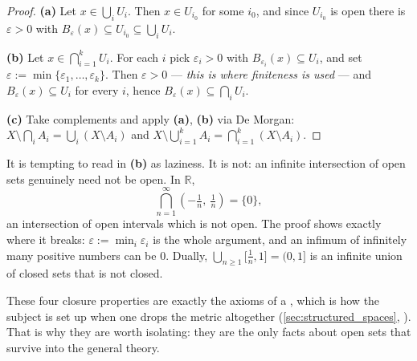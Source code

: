 \begin{proof}
\textbf{(a)} Let $x \in \bigcup_i U_i$. Then $x \in U_{i_0}$ for some $i_0$, and since $U_{i_0}$
is open there is $\varepsilon>0$ with $B_\varepsilon(x) \subseteq U_{i_0} \subseteq \bigcup_iU_i$.

\textbf{(b)} Let $x \in \bigcap_{i=1}^kU_i$. For each $i$ pick $\varepsilon_i>0$ with
$B_{\varepsilon_i}(x) \subseteq U_i$, and set $\varepsilon := \min\{\varepsilon_1,\dots,\varepsilon_k\}$.
Then $\varepsilon > 0$ --- \emph{this is where finiteness is used} --- and
$B_\varepsilon(x) \subseteq U_i$ for every $i$, hence $B_\varepsilon(x) \subseteq \bigcap_iU_i$.

\textbf{(c)} Take complements and apply \textbf{(a)}, \textbf{(b)} via De Morgan:
$X\setminus\bigcap_iA_i = \bigcup_i(X\setminus A_i)$ and
$X\setminus\bigcup_{i=1}^kA_i = \bigcap_{i=1}^k(X\setminus A_i)$.
\end{proof}

\begin{importantremark}
\label{rem:finiteness_is_necessary}
It is tempting to read  in \textbf{(b)} as laziness. It is not: an infinite
intersection of open sets genuinely need not be open. In $\mathbb{R}$,
\[\bigcap_{n=1}^{\infty}\left(-\tfrac1n,\ \tfrac1n\right) = \{0\},\]
an intersection of open intervals which is not open. The proof shows exactly where it breaks:
$\varepsilon := \min_i\varepsilon_i$ is the whole argument, and an infimum of infinitely many
positive numbers can be $0$. Dually, $\bigcup_{n\geq1}\big[\tfrac1n,1\big] = (0,1]$ is an
infinite union of closed sets that is not closed.

\begin{ainote}
These four closure properties are exactly the axioms of a , which is how the
subject is set up when one drops the metric altogether (\cref{sec:structured_spaces},
). That is why they are worth isolating: they are the only facts about open
sets that survive into the general theory.
\end{ainote}
\end{importantremark}

